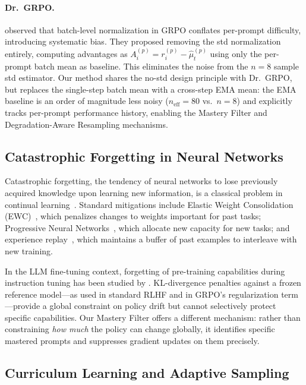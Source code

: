 \documentclass[11pt]{article}
\theoremstyle{definition}
\begin{document}
\paragraph{Dr.\ GRPO.}
\citet{liu2025drgrpo} observed that batch-level normalization in GRPO
conflates per-prompt difficulty, introducing systematic bias.
They proposed removing the std normalization entirely, computing advantages
as $A_i^{(p)} = r_i^{(p)} - \hat{\mu}_t^{(p)}$ using only the per-prompt
batch mean as baseline.
This eliminates the noise from the $n=8$ sample std estimator.
Our method shares the no-std design principle with Dr.\ GRPO, but replaces
the single-step batch mean with a cross-step EMA mean: the EMA baseline
is an order of magnitude less noisy ($n_{\mathrm{eff}} = 80$ vs.\ $n=8$)
and explicitly tracks per-prompt performance history, enabling the Mastery
Filter and Degradation-Aware Resampling mechanisms.

\subsection{Catastrophic Forgetting in Neural Networks}

Catastrophic forgetting, the tendency of neural networks to lose previously
acquired knowledge upon learning new information, is a classical problem in
continual learning~\citep{mccloskey1989catastrophic,french1999catastrophic}.
Standard mitigations include Elastic Weight Consolidation
(EWC)~\citep{kirkpatrick2017overcoming}, which penalizes changes to weights
important for past tasks; Progressive Neural Networks~\citep{rusu2016progressive},
which allocate new capacity for new tasks; and experience
replay~\citep{riemer2018learning,rolnick2019experience}, which maintains a
buffer of past examples to interleave with new training.

In the LLM fine-tuning context, forgetting of pre-training capabilities
during instruction tuning has been studied by
\citet{luo2023empirical,kotha2023understanding}.
KL-divergence penalties against a frozen reference model—as used in standard
RLHF and in GRPO's regularization term—provide a global constraint on policy
drift but cannot selectively protect specific capabilities.
Our Mastery Filter offers a different mechanism: rather than constraining
\emph{how much} the policy can change globally, it identifies specific mastered
prompts and suppresses gradient updates on them precisely.

\subsection{Curriculum Learning and Adaptive Sampling}
\end{document}
